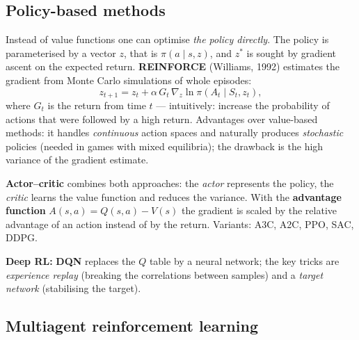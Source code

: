 \documentclass[11pt,a4paper]{article}
\theoremstyle{definition}
\begin{document}
\subsection{Policy-based methods}

\begin{defbox}
Instead of value functions one can optimise \emph{the policy directly}. The policy is
parameterised by a vector $z$, that is $\pi(a \mid s, z)$, and $z^*$ is sought by gradient
ascent on the expected return. \textbf{REINFORCE} (Williams, 1992) estimates the gradient from
Monte Carlo simulations of whole episodes:
\[
z_{t+1} = z_t + \alpha\, G_t\, \nabla_z \ln \pi(A_t \mid S_t, z_t),
\]
where $G_t$ is the return from time $t$ --- intuitively: increase the probability of actions
that were followed by a high return. Advantages over value-based methods: it handles
\emph{continuous} action spaces and naturally produces \emph{stochastic} policies (needed in
games with mixed equilibria); the drawback is the high variance of the gradient estimate.

\textbf{Actor--critic} combines both approaches: the \emph{actor} represents the policy, the
\emph{critic} learns the value function and reduces the variance. With the \textbf{advantage
function} $A(s,a) = Q(s,a) - V(s)$ the gradient is scaled by the relative advantage of an action
instead of by the return. Variants: A3C, A2C, PPO, SAC, DDPG.

\textbf{Deep RL:} \textbf{DQN} replaces the $Q$ table by a neural network; the key tricks are
\emph{experience replay} (breaking the correlations between samples) and a \emph{target network}
(stabilising the target).
\end{defbox}

\subsection{Multiagent reinforcement learning}
\end{document}
